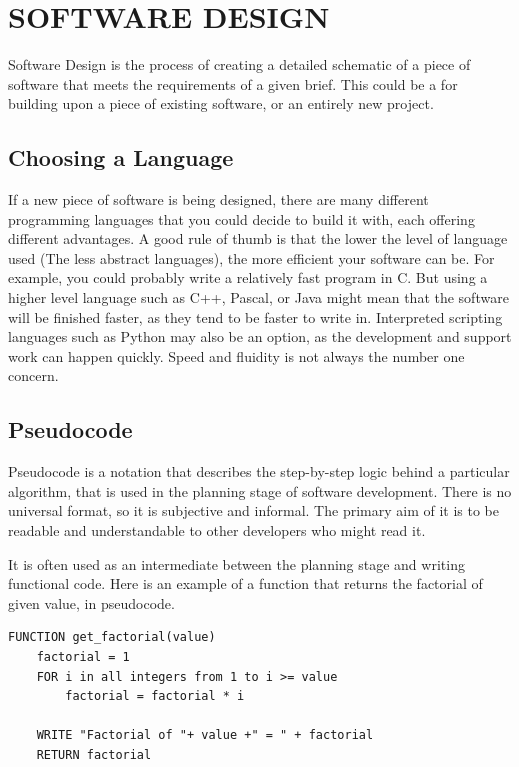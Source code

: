 \pagebreak\hypertarget{software-design}{%
\section{SOFTWARE DESIGN}\label{software-design}}

Software Design is the process of creating a detailed schematic of a piece of software that meets the requirements of a given brief. This could be a for building upon a piece of existing software, or an entirely new project.

\hypertarget{choosing-a-language}{%
\subsection{Choosing a Language}\label{choosing-a-language}}

If a new piece of software is being designed, there are many different programming languages that you could decide to build it with, each offering different advantages. A good rule of thumb is that the lower the level of language used (The less abstract languages), the more efficient your software can be. For example, you could probably write a relatively fast program in C. But using a higher level language such as C++, Pascal, or Java might mean that the software will be finished faster, as they tend to be faster to write in. Interpreted scripting languages such as Python may also be an option, as the development and support work can happen quickly. Speed and fluidity is not always the number one concern.

\hypertarget{pseudocode}{%
\subsection{Pseudocode}\label{pseudocode}}

Pseudocode is a notation that describes the step-by-step logic behind a particular algorithm, that is used in the planning stage of software development. There is no universal format, so it is subjective and informal. The primary aim of it is to be readable and understandable to other developers who might read it.

It is often used as an intermediate between the planning stage and writing functional code. Here is an example of a function that returns the factorial of given value, in pseudocode.

\begin{verbatim}
FUNCTION get_factorial(value)
    factorial = 1
    FOR i in all integers from 1 to i >= value
        factorial = factorial * i

    WRITE "Factorial of "+ value +" = " + factorial
    RETURN factorial
\end{verbatim}

